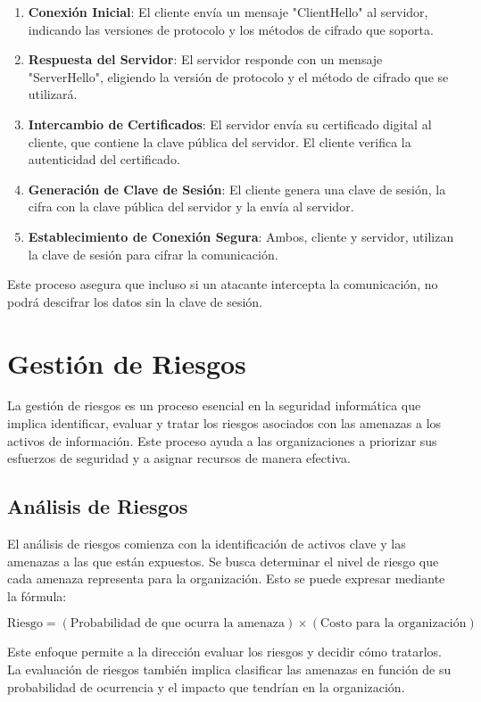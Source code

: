 \begin{enumerate}
    \item \textbf{Conexión Inicial}: El cliente envía un mensaje "ClientHello" al servidor, indicando las versiones de protocolo y los métodos de cifrado que soporta.
    \item \textbf{Respuesta del Servidor}: El servidor responde con un mensaje "ServerHello", eligiendo la versión de protocolo y el método de cifrado que se utilizará.
    \item \textbf{Intercambio de Certificados}: El servidor envía su certificado digital al cliente, que contiene la clave pública del servidor. El cliente verifica la autenticidad del certificado.
    \item \textbf{Generación de Clave de Sesión}: El cliente genera una clave de sesión, la cifra con la clave pública del servidor y la envía al servidor.
    \item \textbf{Establecimiento de Conexión Segura}: Ambos, cliente y servidor, utilizan la clave de sesión para cifrar la comunicación.
\end{enumerate}

Este proceso asegura que incluso si un atacante intercepta la comunicación, no podrá descifrar los datos sin la clave de sesión.
\section{Gestión de Riesgos}
La gestión de riesgos es un proceso esencial en la seguridad informática que implica identificar, evaluar y tratar los riesgos asociados con las amenazas a los activos de información. Este proceso ayuda a las organizaciones a priorizar sus esfuerzos de seguridad y a asignar recursos de manera efectiva.

\subsection{Análisis de Riesgos}
El análisis de riesgos comienza con la identificación de activos clave y las amenazas a las que están expuestos. Se busca determinar el nivel de riesgo que cada amenaza representa para la organización. Esto se puede expresar mediante la fórmula:

\[
\text{Riesgo} = (\text{Probabilidad de que ocurra la amenaza}) \times (\text{Costo para la organización})
\]

Este enfoque permite a la dirección evaluar los riesgos y decidir cómo tratarlos. La evaluación de riesgos también implica clasificar las amenazas en función de su probabilidad de ocurrencia y el impacto que tendrían en la organización.

